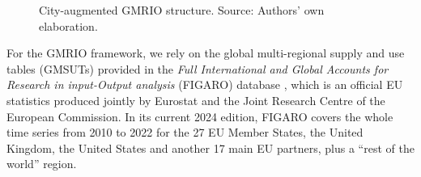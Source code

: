 \documentclass[
  10pt,
  twocolumn]{aft}
\begin{document}
\begin{figure}


\caption{\label{fig-diagram}City-augmented GMRIO structure. Source:
Authors' own elaboration.}

\end{figure}%

For the GMRIO framework, we rely on the global multi-regional supply and
use tables (GMSUTs) provided in the \emph{Full International and Global
Accounts for Research in input-Output analysis} (FIGARO) database
\citep{remond-tiedrez_eu_2019}, which is an official EU statistics
produced jointly by Eurostat and the Joint Research Centre of the
European Commission. In its current 2024 edition, FIGARO covers the
whole time series from 2010 to 2022 for the 27 EU Member States, the
United Kingdom, the United States and another 17 main EU partners, plus
a ``rest of the world'' region.
\end{document}

